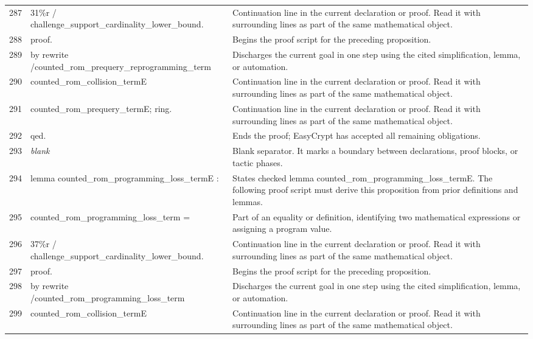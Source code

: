 \documentclass[10pt]{article}
\begin{document}
\begin{longtable}{r L{0.53\textwidth} L{0.37\textwidth}}
287 & {\ttfamily\scriptsize     31\%r / challenge\_support\_cardinality\_lower\_bound.} & Continuation line in the current declaration or proof.  Read it with surrounding lines as part of the same mathematical object. \\
288 & {\ttfamily\scriptsize proof.} & Begins the proof script for the preceding proposition. \\
289 & {\ttfamily\scriptsize by rewrite /counted\_rom\_prequery\_reprogramming\_term} & Discharges the current goal in one step using the cited simplification, lemma, or automation. \\
290 & {\ttfamily\scriptsize            counted\_rom\_collision\_termE} & Continuation line in the current declaration or proof.  Read it with surrounding lines as part of the same mathematical object. \\
291 & {\ttfamily\scriptsize            counted\_rom\_prequery\_termE; ring.} & Continuation line in the current declaration or proof.  Read it with surrounding lines as part of the same mathematical object. \\
292 & {\ttfamily\scriptsize qed.} & Ends the proof; EasyCrypt has accepted all remaining obligations. \\
293 & {\ttfamily\scriptsize \emph{blank}} & Blank separator.  It marks a boundary between declarations, proof blocks, or tactic phases. \\
294 & {\ttfamily\scriptsize lemma counted\_rom\_programming\_loss\_termE :} & States checked lemma counted\_rom\_programming\_loss\_termE.  The following proof script must derive this proposition from prior definitions and lemmas. \\
295 & {\ttfamily\scriptsize   counted\_rom\_programming\_loss\_term =} & Part of an equality or definition, identifying two mathematical expressions or assigning a program value. \\
296 & {\ttfamily\scriptsize     37\%r / challenge\_support\_cardinality\_lower\_bound.} & Continuation line in the current declaration or proof.  Read it with surrounding lines as part of the same mathematical object. \\
297 & {\ttfamily\scriptsize proof.} & Begins the proof script for the preceding proposition. \\
298 & {\ttfamily\scriptsize by rewrite /counted\_rom\_programming\_loss\_term} & Discharges the current goal in one step using the cited simplification, lemma, or automation. \\
299 & {\ttfamily\scriptsize            counted\_rom\_collision\_termE} & Continuation line in the current declaration or proof.  Read it with surrounding lines as part of the same mathematical object. \\

\end{longtable}
\end{document}

